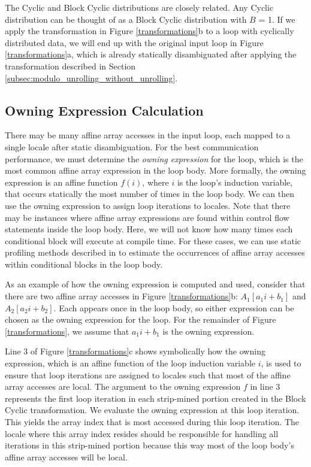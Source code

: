 The Cyclic and Block Cyclic distributions are closely related. Any Cyclic distribution can be thought of as a Block Cyclic distribution with $B$ = 1. If we apply the transformation in Figure \ref{transformations}b to a loop with cyclically distributed data, we will end up with the original input loop in Figure \ref{transformations}a, which is already statically disambiguated after applying the transformation described in Section \ref{subsec:modulo_unrolling_without_unrolling}. 

\subsection{Owning Expression Calculation}\label{subsec:owning_expression_calculation}

There may be many affine array accesses in the input loop, each mapped to a single locale after static disambiguation. For the best communication performance, we must determine the \textit{owning expression} for the loop, which is the most common affine array expression in the loop body. More formally, the owning expression is an affine function $f(i)$, where $i$ is the loop's induction variable, that occurs statically the most number of times in the loop body. We can then use the owning expression to assign loop iterations to locales. Note that there may be instances where affine array expressions are found within control flow statements inside the loop body. Here, we will not know how many times each conditional block will execute at compile time. For these cases, we can use static profiling methods described in \cite{wu1994static} to estimate the occurrences of affine array accesses within conditional blocks in the loop body. 

As an example of how the owning expression is computed and used, consider that there are two affine array accesses in Figure \ref{transformations}b: $A_{1}[a_{1}i+b_{1}]$ and $A_{2}[a_{2}i+b_{2}]$. Each appears once in the loop body, so either expression can be chosen as the owning expression for the loop. For the remainder of Figure \ref{transformations}, we assume that $a_{1}i+b_{1}$ is the owning expression. 

Line 3 of Figure \ref{transformations}c shows symbolically how the owning expression, which is an affine function of the loop induction variable $i$, is used to ensure that loop iterations are assigned to locales such that most of the affine array accesses are local. The argument to the owning expression $f$ in line 3 represents the first loop iteration in each strip-mined portion created in the Block Cyclic transformation. We evaluate the owning expression at this loop iteration. This yields the array index that is most accessed during this loop iteration. The locale where this array index resides should be responsible for handling all iterations in this strip-mined portion because this way most of the loop body's affine array accesses will be local.

